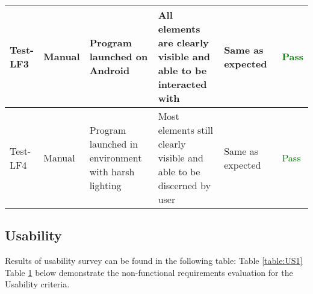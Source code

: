 \documentclass[12pt, titlepage]{article}
\begin{document}
\begin{table}[H]
{\begin{tabular}{|l|p{0.15\linewidth}|p{0.3\linewidth}|p{0.3\linewidth}|p{0.3\linewidth}|p{0.1\linewidth}|}
\hline
Test-LF3 & Manual & Program launched on Android & All elements are clearly visible and able to be interacted with & Same as expected & \textcolor{Green}{Pass} \\
\hline
Test-LF4 & Manual & Program launched in environment with harsh lighting & Most elements still clearly visible and able to be discerned by user & Same as expected & \textcolor{Green}{Pass} \\
\hline
\end{tabular}}
\label{table:LF1}
\end{table}

\subsection{Usability}

Results of usability survey can be found in the following table: Table \ref{table:US1}\\

Table \ref{table:LF1} below demonstrate the non-functional requirements evaluation for the Usability criteria.
\end{document}
